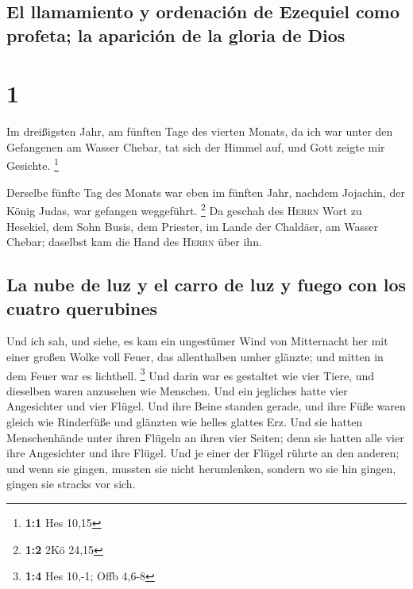 \hypertarget{el-llamamiento-y-ordenaciuxf3n-de-ezequiel-como-profeta-la-apariciuxf3n-de-la-gloria-de-dios}{%
\subsection{El llamamiento y ordenación de Ezequiel como profeta; la
aparición de la gloria de
Dios}\label{el-llamamiento-y-ordenaciuxf3n-de-ezequiel-como-profeta-la-apariciuxf3n-de-la-gloria-de-dios}}

\hypertarget{section}{%
\section{1}\label{section}}

 Im dreißigsten Jahr, am fünften Tage des vierten Monats,
da ich war unter den Gefangenen am Wasser Chebar, tat sich der Himmel
auf, und Gott zeigte mir Gesichte. \footnote{\textbf{1:1} Hes 10,15}

 Derselbe fünfte Tag des Monats war eben im fünften Jahr,
nachdem Jojachin, der König Judas, war gefangen weggeführt. \footnote{\textbf{1:2}
  2Kö 24,15}  Da geschah des \textsc{Herrn} Wort zu
Hesekiel, dem Sohn Busis, dem Priester, im Lande der Chaldäer, am Wasser
Chebar; daselbst kam die Hand des \textsc{Herrn} über ihn.

\hypertarget{la-nube-de-luz-y-el-carro-de-luz-y-fuego-con-los-cuatro-querubines}{%
\subsection{La nube de luz y el carro de luz y fuego con los cuatro
querubines}\label{la-nube-de-luz-y-el-carro-de-luz-y-fuego-con-los-cuatro-querubines}}

 Und ich sah, und siehe, es kam ein ungestümer Wind von
Mitternacht her mit einer großen Wolke voll Feuer, das allenthalben
umher glänzte; und mitten in dem Feuer war es lichthell. \footnote{\textbf{1:4}
  Hes 10,-1; Offb 4,6-8}  Und darin war es gestaltet wie
vier Tiere, und dieselben waren anzusehen wie Menschen. 
Und ein jegliches hatte vier Angesichter und vier Flügel. 
Und ihre Beine standen gerade, und ihre Füße waren gleich wie Rinderfüße
und glänzten wie helles glattes Erz.  Und sie hatten
Menschenhände unter ihren Flügeln an ihren vier Seiten; denn sie hatten
alle vier ihre Angesichter und ihre Flügel.  Und je einer
der Flügel rührte an den anderen; und wenn sie gingen, mussten sie nicht
herumlenken, sondern wo sie hin gingen, gingen sie stracks vor sich.

